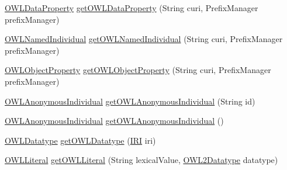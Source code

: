 \begin{DoxyCompactItemize}
\item 
\hyperlink{interfaceorg_1_1semanticweb_1_1owlapi_1_1model_1_1_o_w_l_data_property}{O\-W\-L\-Data\-Property} \hyperlink{classuk_1_1ac_1_1manchester_1_1cs_1_1owl_1_1owlapi_1_1_o_w_l_data_factory_impl_aef5089f1da9b09d0bdf4d3b2da3c3919}{get\-O\-W\-L\-Data\-Property} (String curi, Prefix\-Manager prefix\-Manager)
\item 
\hyperlink{interfaceorg_1_1semanticweb_1_1owlapi_1_1model_1_1_o_w_l_named_individual}{O\-W\-L\-Named\-Individual} \hyperlink{classuk_1_1ac_1_1manchester_1_1cs_1_1owl_1_1owlapi_1_1_o_w_l_data_factory_impl_abacc1ff313e70b2a3ff52475021b6fe3}{get\-O\-W\-L\-Named\-Individual} (String curi, Prefix\-Manager prefix\-Manager)
\item 
\hyperlink{interfaceorg_1_1semanticweb_1_1owlapi_1_1model_1_1_o_w_l_object_property}{O\-W\-L\-Object\-Property} \hyperlink{classuk_1_1ac_1_1manchester_1_1cs_1_1owl_1_1owlapi_1_1_o_w_l_data_factory_impl_a628e482e94dd00f80ce4abc4d50ea75b}{get\-O\-W\-L\-Object\-Property} (String curi, Prefix\-Manager prefix\-Manager)
\item 
\hyperlink{interfaceorg_1_1semanticweb_1_1owlapi_1_1model_1_1_o_w_l_anonymous_individual}{O\-W\-L\-Anonymous\-Individual} \hyperlink{classuk_1_1ac_1_1manchester_1_1cs_1_1owl_1_1owlapi_1_1_o_w_l_data_factory_impl_a91a704ba2bffcc52678cce814abd0ba2}{get\-O\-W\-L\-Anonymous\-Individual} (String id)
\item 
\hyperlink{interfaceorg_1_1semanticweb_1_1owlapi_1_1model_1_1_o_w_l_anonymous_individual}{O\-W\-L\-Anonymous\-Individual} \hyperlink{classuk_1_1ac_1_1manchester_1_1cs_1_1owl_1_1owlapi_1_1_o_w_l_data_factory_impl_ad502d897e282faf1cd005eee062b6f62}{get\-O\-W\-L\-Anonymous\-Individual} ()
\item 
\hyperlink{interfaceorg_1_1semanticweb_1_1owlapi_1_1model_1_1_o_w_l_datatype}{O\-W\-L\-Datatype} \hyperlink{classuk_1_1ac_1_1manchester_1_1cs_1_1owl_1_1owlapi_1_1_o_w_l_data_factory_impl_aa62299b49a434afc1f03b7bc70d06867}{get\-O\-W\-L\-Datatype} (\hyperlink{classorg_1_1semanticweb_1_1owlapi_1_1model_1_1_i_r_i}{I\-R\-I} iri)
\item 
\hyperlink{interfaceorg_1_1semanticweb_1_1owlapi_1_1model_1_1_o_w_l_literal}{O\-W\-L\-Literal} \hyperlink{classuk_1_1ac_1_1manchester_1_1cs_1_1owl_1_1owlapi_1_1_o_w_l_data_factory_impl_a6215f1ef8d38f2b123ba1c6a4a3dedd9}{get\-O\-W\-L\-Literal} (String lexical\-Value, \hyperlink{enumorg_1_1semanticweb_1_1owlapi_1_1vocab_1_1_o_w_l2_datatype}{O\-W\-L2\-Datatype} datatype)
\item 

\end{DoxyCompactItemize}
